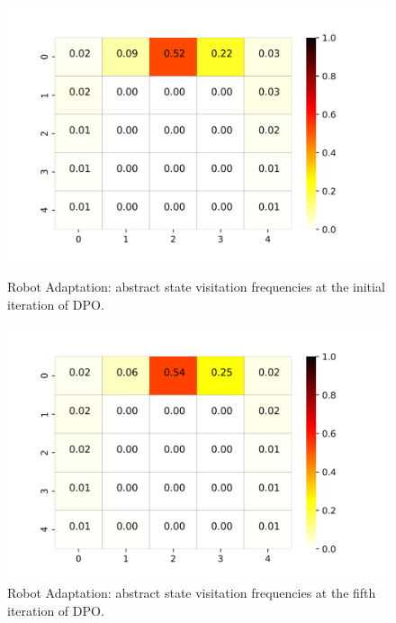 \begin{figure}[h!]
	\centering
	\begin{minipage}[t]{.45\columnwidth}
		\includegraphics[width=\textwidth]{plots/colormap0.png}
		\caption{Robot Adaptation: abstract state visitation frequencies at the initial iteration of DPO.}
		\label{fig:cm0}
	\end{minipage}%
	\hfill
	\begin{minipage}[t]{.45\columnwidth}
		\includegraphics[width=\textwidth]{plots/colormap5.png}
		\caption{Robot Adaptation: abstract state visitation frequencies at the fifth iteration of DPO.}
		\label{fig:cm5}
	\end{minipage}
\end{figure}

